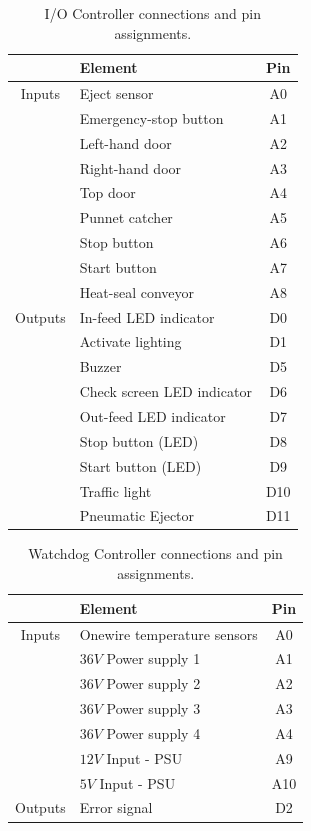 \documentclass[fleqn,twoside,12pt]{report}
\begin{document}
\begin{table}[h]
	\centering
	\caption{I/O Controller connections and pin assignments.}
	\label{tab:IO_tasks}
	\begin{tabular}{clc}
		\toprule
				& \textbf{Element} & \textbf{Pin} \\[8pt]
		\midrule
		Inputs 	& Eject sensor 			& A0 \\[4pt]
				& Emergency-stop button	& A1 \\[4pt]
				& Left-hand door 		& A2 \\[4pt]
				& Right-hand door 		& A3 \\[4pt]
				& Top door 				& A4 \\[4pt]
				& Punnet catcher 		& A5 \\[4pt]
				& Stop button 			& A6 \\[4pt]
				& Start button	 		& A7 \\[4pt]
				& Heat-seal conveyor	& A8 \\[4pt]
				
		Outputs	& In-feed LED indicator			& D0  \\[4pt]
				& Activate lighting				& D1  \\[4pt]
				& Buzzer						& D5  \\[4pt]
				& Check screen LED indicator	& D6  \\[4pt]
				& Out-feed LED indicator 		& D7  \\[4pt]
				& Stop button (LED)				& D8  \\[4pt]
				& Start button (LED)			& D9  \\[4pt]
				& Traffic light					& D10  \\[4pt]
				& Pneumatic Ejector				& D11  \\[4pt]
		\bottomrule
		
	\end{tabular}
\end{table}




\begin{table}[h]
	\centering
	\caption{Watchdog Controller connections and pin assignments.}
	\label{tab:watchdog_tasks}
	\begin{tabular}{clc}
		\toprule
				& \textbf{Element} & \textbf{Pin} \\[8pt]
		\midrule
		Inputs 	& Onewire temperature sensors 	& A0 \\[4pt]
				& $36V$ Power supply 1 			& A1 \\[4pt]
				& $36V$ Power supply 2 			& A2 \\[4pt]
				& $36V$ Power supply 3 			& A3 \\[4pt]
				& $36V$ Power supply 4 			& A4 \\[4pt]
				& $12V$ Input - PSU 			& A9 \\[4pt]
				& $5V$ Input - PSU 				& A10 \\[4pt]
		
		Outputs	& Error signal			& D2  \\[4pt]
		\bottomrule
		
	\end{tabular}
\end{table}
\end{document}
